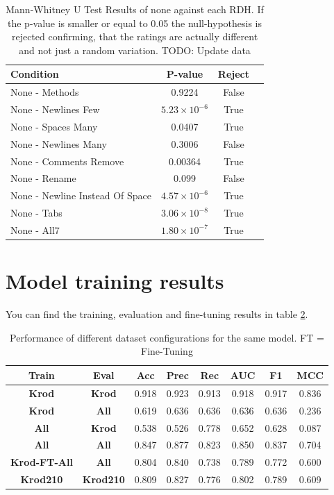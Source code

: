 \documentclass[%
class=scrreprt,
chapterprefix=false,%
open=right,%
twoside=false,%
paper=a4,%
logofile={Logo\_zentral\_farbig\_EN.png},%
thesistype=master,%
UKenglish,%
]{se2thesis}
\begin{document}
	\begin{table}[h]
		\centering
		\begin{tabular}{lccc}
			\toprule
			\textbf{Condition} & \textbf{P-value} & \textbf{Reject} \\
			\midrule
			None - Methods & 0.9224 & False \\
			None - Newlines Few & $5.23 \times 10^{-6}$ & True \\
			None - Spaces Many & 0.0407 & True \\
			None - Newlines Many & 0.3006 & False \\
			None - Comments Remove & 0.00364 & True \\
			None - Rename & 0.099 & False \\
			None - Newline Instead Of Space & $4.57 \times 10^{-6}$ & True \\
			None - Tabs & $3.06 \times 10^{-8}$ & True \\
			None - All7 & $1.80 \times 10^{-7}$ & True \\
			\bottomrule
		\end{tabular}
		\caption{Mann-Whitney U Test Results of none against each RDH. If the p-value is smaller or equal to 0.05 the null-hypothesis is rejected confirming, that the ratings are actually different and not just a random variation. TODO: Update data}
		\label{tab:survey_statistical_evidence}
	\end{table}

	
\section{Model training results} \label{Model training results}
	You can find the training, evaluation and fine-tuning results in table \ref{tab:dataset_performance}.
		
	\begin{table}[h]
		\centering
		\begin{tabular}{|c|c|c|c|c|c|c|c|}
			\hline
			\textbf{Train} & \textbf{Eval} & \textbf{Acc} & \textbf{Prec} & \textbf{Rec} & \textbf{AUC} & \textbf{F1} & \textbf{MCC} \\
			\hline
			\textbf{Krod} 		& \textbf{Krod} 	& 0.918 & 0.923 & 0.913 & 0.918 & 0.917 & 0.836 \\
			\textbf{Krod} 		& \textbf{All}  	& 0.619 & 0.636 & 0.636 & 0.636 & 0.636 & 0.236 \\
			\textbf{All} 		& \textbf{Krod} 	& 0.538 & 0.526 & 0.778 & 0.652 & 0.628 & 0.087 \\
			\textbf{All}  		& \textbf{All}  	& 0.847 & 0.877 & 0.823 & 0.850 & 0.837 & 0.704 \\
			
			\textbf{Krod-FT-All}& \textbf{All}  	& 0.804 & 0.840 & 0.738 & 0.789 & 0.772 & 0.600 \\
			\textbf{Krod210}  	& \textbf{Krod210}  & 0.809 & 0.827 & 0.776 & 0.802 & 0.789 & 0.609 \\
			\hline
		\end{tabular}
		\caption{Performance of different dataset configurations for the same model. FT = Fine-Tuning}
		\label{tab:dataset_performance}
	\end{table}
\end{document}
